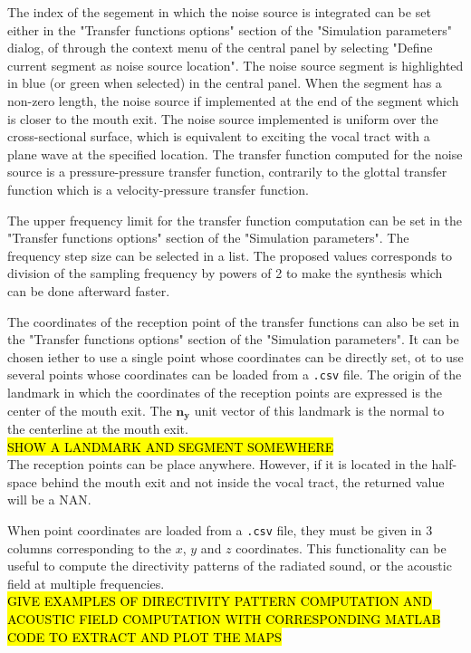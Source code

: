 \documentclass[]{article}
\begin{document}
	The index of the segement in which the noise source is integrated can be 
	set either in the "Transfer functions options" section of the "Simulation parameters"
	dialog, of through the context menu of the central panel by selecting 
	"Define current segment as noise source location". 
	The noise source segment is highlighted in blue (or green when selected) in the 
	central panel.
	When the segment has a non-zero length, the noise source if implemented at 
	the end of the segment which is closer to the mouth exit.
	The noise source implemented is uniform over the cross-sectional surface, which
	is equivalent to exciting the vocal tract with a plane wave at the specified location.
	The transfer function computed for the noise source is a pressure-pressure 
	transfer function, contrarily to the glottal transfer function which is a 
	velocity-pressure transfer function.
	
	The upper frequency limit for the transfer function computation can be set
	in the "Transfer functions options" section of the "Simulation parameters".
	The frequency step size can be selected in a list. 
	The proposed values corresponds to division of the sampling frequency by powers
	of 2 to make the synthesis which can be done afterward faster.
	
	The coordinates of the reception point of the transfer functions can also be set
	in the "Transfer functions options" section of the "Simulation parameters".
	It can be chosen iether to use a single point whose coordinates can be 
	directly set, ot to use several points whose coordinates can be loaded from
	a \texttt{.csv} file. 
	The origin of the landmark in which the coordinates of the reception points are
	expressed is the center of the mouth exit. 
	The $\bm{n_y}$ unit vector of this landmark is the normal to the centerline
	at the mouth exit.
	\\ \hl{SHOW A LANDMARK AND SEGMENT SOMEWHERE} \\
	The reception points can be place anywhere. 
	However, if it is located in the half-space behind the mouth exit and not 
	inside the vocal tract, the returned value will be a NAN.
	
	When point coordinates are loaded from a \texttt{.csv} file, they must be given
	in 3 columns corresponding to the $x$, $y$ and $z$ coordinates. 
	This functionality can be useful to compute the directivity patterns of the 
	radiated sound, or the acoustic field at multiple frequencies.
	\\ \hl{GIVE EXAMPLES OF DIRECTIVITY PATTERN COMPUTATION AND ACOUSTIC 
		FIELD COMPUTATION WITH CORRESPONDING MATLAB CODE TO EXTRACT AND PLOT 
		THE MAPS} \\
	
\end{document}
